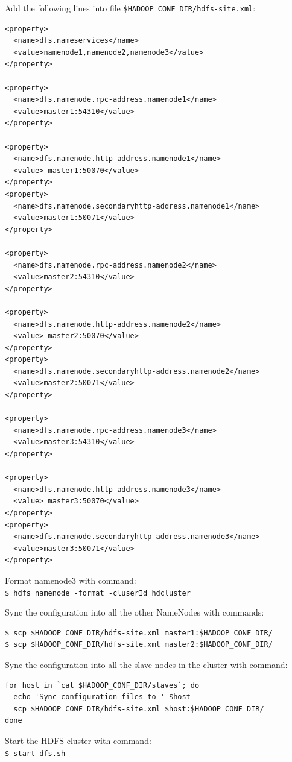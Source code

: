 Add the following lines into file \verb|$HADOOP_CONF_DIR/hdfs-site.xml|:
\lstset{style=bashstyle}
\begin{lstlisting}
<property>
  <name>dfs.nameservices</name>
  <value>namenode1,namenode2,namenode3</value>
</property>

<property>
  <name>dfs.namenode.rpc-address.namenode1</name>
  <value>master1:54310</value>
</property>

<property>
  <name>dfs.namenode.http-address.namenode1</name>
  <value> master1:50070</value>
</property>
<property>
  <name>dfs.namenode.secondaryhttp-address.namenode1</name>
  <value>master1:50071</value>
</property>

<property>
  <name>dfs.namenode.rpc-address.namenode2</name>
  <value>master2:54310</value>
</property>

<property>
  <name>dfs.namenode.http-address.namenode2</name>
  <value> master2:50070</value>
</property>
<property>
  <name>dfs.namenode.secondaryhttp-address.namenode2</name>
  <value>master2:50071</value>
</property>

<property>
  <name>dfs.namenode.rpc-address.namenode3</name>
  <value>master3:54310</value>
</property>

<property>
  <name>dfs.namenode.http-address.namenode3</name>
  <value> master3:50070</value>
</property>
<property>
  <name>dfs.namenode.secondaryhttp-address.namenode3</name>
  <value>master3:50071</value>
</property>
\end{lstlisting}

Format namenode3 with command: \\
\verb|$ hdfs namenode -format -cluserId hdcluster|

Sync the configuration into all the other NameNodes with commands:
\lstset{style=bashstyle}
\begin{lstlisting}
$ scp $HADOOP_CONF_DIR/hdfs-site.xml master1:$HADOOP_CONF_DIR/
$ scp $HADOOP_CONF_DIR/hdfs-site.xml master2:$HADOOP_CONF_DIR/
\end{lstlisting}

Sync the configuration into all the slave nodes in the cluster with command:
\lstset{style=bashstyle}
\begin{lstlisting}
for host in `cat $HADOOP_CONF_DIR/slaves`; do
  echo 'Sync configuration files to ' $host
  scp $HADOOP_CONF_DIR/hdfs-site.xml $host:$HADOOP_CONF_DIR/
done
\end{lstlisting}

Start the HDFS cluster with command: \\
\verb|$ start-dfs.sh|

